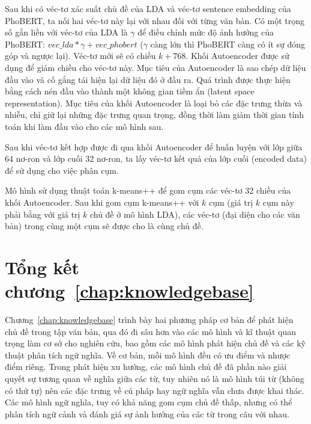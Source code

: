 Sau khi có véc-tơ xác suất chủ đề của LDA và véc-tơ sentence embedding của PhoBERT, ta nối hai véc-tơ này lại với nhau đối với từng văn bản. Có một trọng số gắn liền với véc-tơ của LDA là $\gamma$ để điều chỉnh mức độ ảnh hưởng của PhoBERT: $vec\_lda * \gamma + vec\_phobert$ ($\gamma$ càng lớn thì PhoBERT càng có ít sự đóng góp và ngược lại). Véc-tơ mới sẽ có chiều $k + 768$. Khối Autoencoder được sử dụng để giảm chiều cho véc-tơ này. Mục tiêu của Autoencoder là sao chép dữ liệu đầu vào và cố gắng tái hiện lại dữ liệu đó ở đầu ra. Quá trình được thực hiện bằng cách nén đầu vào thành một không gian tiềm ẩn (latent space representation). Mục tiêu của khối Autoencoder là loại bỏ các đặc trưng thừa và nhiễu, chỉ giữ lại những đặc trưng quan trọng, đồng thời làm giảm thời gian tính toán khi làm đầu vào cho các mô hình sau.

Sau khi véc-tơ kết hợp được đi qua khối Autoencoder để huấn luyện với lớp giữa 64 nơ-ron và lớp cuối 32 nơ-ron, ta lấy véc-tơ kết quả của lớp cuối (encoded data) để sử dụng cho việc phân cụm.

Mô hình sử dụng thuật toán k-means++ để gom cụm các véc-tơ 32 chiều của khối Autoencoder. Sau khi gom cụm k-means++ với $k$ cụm (giá trị $k$ cụm này phải bằng với giá trị $k$ chủ đề ở mô hình LDA), các véc-tơ (đại diện cho các văn bản) trong cùng một cụm sẽ được cho là cùng chủ đề.


\section{Tổng kết chương~\ref{chap:knowledgebase}}
Chương~\ref{chap:knowledgebase} trình bày hai phương pháp cơ bản để phát hiện chủ đề trong tập văn bản, qua đó đi sâu hơn vào các mô hình và kĩ thuật quan trọng làm cơ sở cho nghiên cứu, bao gồm các mô hình phát hiện chủ đề và các kỹ thuật phân tích ngữ nghĩa. Về cơ bản, mỗi mô hình đều có ưu điểm và nhược điểm riêng. Trong phát hiện xu hướng, các mô hình chủ đề đã phần nào giải quyết sự tương quan về nghĩa giữa các từ, tuy nhiên nó là mô hình túi từ (không có thứ tự) nên các đặc trưng về cú pháp hay ngữ nghĩa vẫn chưa được khai thác. Các mô hình ngữ nghĩa, tuy có khả năng gom cụm chủ đề thấp, nhưng có thể phân tích ngữ cảnh và đánh giá sự ảnh hưởng của các từ trong câu với nhau.

